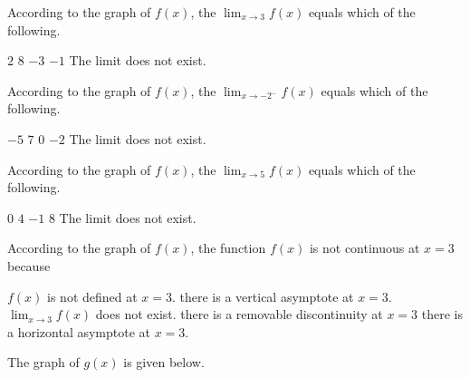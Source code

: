\documentclass[11pt]{article}
\begin{document}
\begin{questions}
\begin{multiplechoice}{5}

\question According to the graph of $f(x)$, the $\lim_{x\to 3}f(x) $ equals which of the following.
\begin{answers}{3}
\ans $2$
\ans $8$
\ans $-3$
\ans $-1$
\ans The limit does not exist.
\end{answers}



\question According to the graph of $f(x)$, the $\lim_{x\to -2^-}f(x) $ equals which of the following.
\begin{answers}{3}
\ans $-5$
\ans $7$
\ans $0$
\ans $-2$
\ans The limit does not exist.
\end{answers}


\question According to the graph of $f(x)$, the $\lim_{x\to 5}f(x) $ equals which of the following.
\begin{answers}{3}
\ans $0$
\ans $4$
\ans $-1$
\ans $8$
\ans The limit does not exist.
\end{answers}





\question According to the graph of $f(x)$, the function $f(x)$ is not continuous at $x=3$ because
\begin{answers}{3}
\ans $f(x)$ is not defined at $x=3$.
\ans there is a vertical asymptote at $x=3$.
\ans $\lim_{x\to 3}f(x)$ does not exist.
\ans there is a removable discontinuity at $x=3$
\ans there is a horizontal asymptote at $x=3$. 
\end{answers}



\newpage

\question The graph of $g(x)$ is given below.\\


\end{multiplechoice}
\end{questions}
\end{document}
